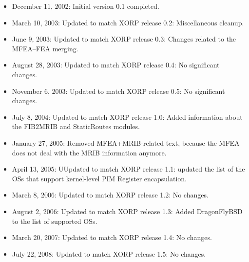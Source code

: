 \documentclass[11pt]{article}
\begin{document}
\begin{itemize}

  \item December 11, 2002: Initial version 0.1 completed.

  \item March 10, 2003: Updated to match XORP release 0.2:
   Miscellaneous cleanup.

  \item June 9, 2003: Updated to match XORP release 0.3:
   Changes related to the MFEA--FEA merging.

  \item August 28, 2003: Updated to match XORP release 0.4:
   No significant changes.

  \item November 6, 2003: Updated to match XORP release 0.5:
   No significant changes.

  \item July 8, 2004: Updated to match XORP release 1.0:
   Added information about the FIB2MRIB and StaticRoutes modules.

  \item January 27, 2005: Removed MFEA+MRIB-related text, because the MFEA
  does not deal with the MRIB information anymore.

  \item April 13, 2005: UUpdated to match XORP release 1.1:
   updated the list of the OSs that support kernel-level PIM Register
   encapsulation.

  \item March 8, 2006: Updated to match XORP release 1.2:
   No changes.

  \item August 2, 2006: Updated to match XORP release 1.3:
   Added DragonFlyBSD to the list of supported OSs.

  \item March 20, 2007: Updated to match XORP release 1.4:
   No changes.

  \item July 22, 2008: Updated to match XORP release 1.5:
   No changes.

\end{itemize}





\end{document}
